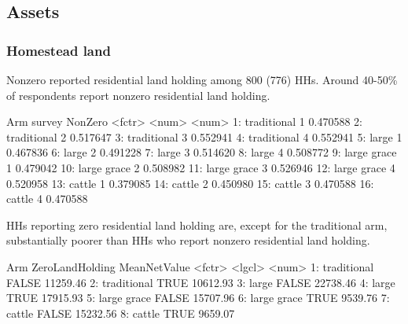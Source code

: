 \subsection{Assets}


\subsubsection{Homestead land}


Nonzero reported residential land holding among 800 (776) HHs. Around 40-50\% of respondents report nonzero residential land holding. 
\begin{Schunk}
\begin{Soutput}
            Arm survey  NonZero
         <fctr>  <num>    <num>
 1: traditional      1 0.470588
 2: traditional      2 0.517647
 3: traditional      3 0.552941
 4: traditional      4 0.552941
 5:       large      1 0.467836
 6:       large      2 0.491228
 7:       large      3 0.514620
 8:       large      4 0.508772
 9: large grace      1 0.479042
10: large grace      2 0.508982
11: large grace      3 0.526946
12: large grace      4 0.520958
13:      cattle      1 0.379085
14:      cattle      2 0.450980
15:      cattle      3 0.470588
16:      cattle      4 0.470588
\end{Soutput}
\end{Schunk}
HHs reporting zero residential land holding are, except for the \textsf{traditional} arm, substantially poorer than HHs who report nonzero residential land holding.
\begin{Schunk}
\begin{Soutput}
           Arm ZeroLandHolding MeanNetValue
        <fctr>          <lgcl>        <num>
1: traditional           FALSE     11259.46
2: traditional            TRUE     10612.93
3:       large           FALSE     22738.46
4:       large            TRUE     17915.93
5: large grace           FALSE     15707.96
6: large grace            TRUE      9539.76
7:      cattle           FALSE     15232.56
8:      cattle            TRUE      9659.07
\end{Soutput}
\end{Schunk}


